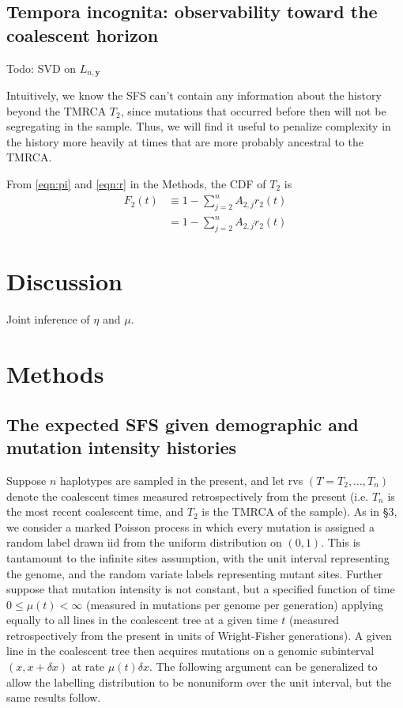 \documentclass[11pt]{article}
\begin{document}
\subsection{Tempora incognita: observability toward the coalescent horizon}\label{sec:model:loss}

Todo: SVD on $L_{n, \boldsymbol y}$

Intuitively, we know the SFS can't contain any information about the history beyond the TMRCA $T_2$, since mutations that occurred before then will not be segregating in the sample.
Thus, we will find it useful to penalize complexity in the history more heavily at times that are more probably ancestral to the TMRCA.

From \eqref{eqn:pi} and \eqref{eqn:r} in the Methods, the CDF of $T_2$ is
\begin{align}
F_2(t) &\equiv 1 - \sum_{j=2}^n A_{2,j}r_2(t)\\
&= 1 - \sum_{j=2}^n A_{2,j}r_2(t)
\end{align}


\section{Discussion}\label{sec:discussion}

Joint inference of $\eta$ and $\mu$.

\section{Methods}\label{sec:methods}

\subsection{The expected SFS given demographic and mutation intensity histories}\label{sec:methods:xi}

Suppose $n$ haplotypes are sampled in the present, and let rvs $(T = T_2,\dots,T_n)$ denote the coalescent times measured retrospectively from the present (i.e. $T_n$ is the most recent coalescent time, and $T_2$ is the TMRCA of the sample).
As in \cite{Griffiths1998-qf} \S3, we consider a marked Poisson process in which every mutation is assigned a random label drawn iid from the uniform distribution on $(0,1)$.
This is tantamount to the infinite sites assumption, with the unit interval representing the genome, and the random variate labels representing mutant sites.
Further suppose that mutation intensity is not constant, but a specified function of time $0\le \mu(t)<\infty$ (measured in mutations per genome per generation) applying equally to all lines in the coalescent tree at a given time $t$ (measured retrospectively from the present in units of Wright-Fisher generations).
A given line in the coalescent tree then acquires mutations on a genomic subinterval $(x,x+\delta x)$ at rate $\mu(t)\delta x$.
The following argument can be generalized to allow the labelling distribution to be nonuniform over the unit interval, but the same results follow.
\end{document}
